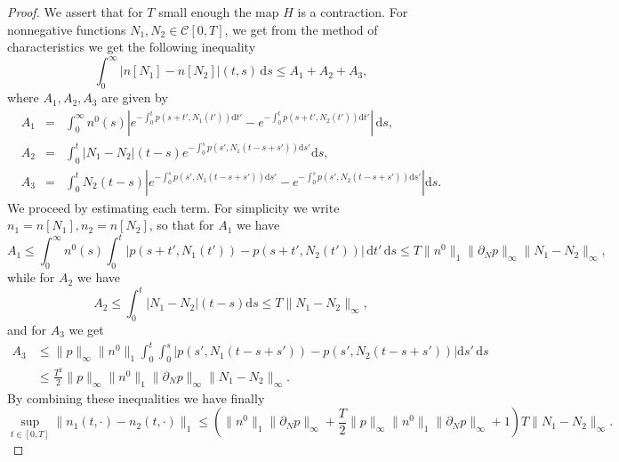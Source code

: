 \documentclass[11pt,a4paper]{article}
\newcommand{\dd}{\mathrm{d}}
\begin{document}
\begin{proof}
    We assert that for $T$ small enough the map $H$ is a contraction. For nonnegative functions $N_1,N_2\in\mathcal{C}[0,T]$, we get from the method of characteristics we get the following inequality
  \begin{equation*}
    \int_0^\infty |n[N_1]-n[N_2]|(t,s)\,\dd s\le A_1+A_2+A_3,
  \end{equation*}
    where $A_1,A_2,A_3$ are given by
    \begin{eqnarray*}
        A_1&=&\int_0^\infty n^0(s)\left|e^{-\int_0^t p(s+t',N_1(t'))\dd t'}-e^{-\int_0^t p(s+t',N_2(t'))\dd t'}\right|\,\dd s,\\
        A_2&=&\int_0^t |N_1-N_2|(t-s) e^{-\int_0^s p(s',N_1(t-s+s'))\dd s'}\dd s,\\
        A_3&=&\int_0^t N_2(t-s)\left|e^{-\int_0^s p(s',N_1(t-s+s'))\dd s'}-e^{-\int_0^s p(s',N_2(t-s+s'))\dd s'} \right|\dd s.
    \end{eqnarray*}
    We proceed by estimating each term. For simplicity we write $n_1=n[N_1],n_2=n[N_2]$, so that for $A_1$ we have
    $$A_1\le \int_0^\infty n^0(s)\int_0^t|p(s+t',N_1(t'))-p(s+t',N_2(t'))|\,\dd t'\,\dd s \le T\|n^0\|_1 \|\partial_N p\|_\infty \|N_1-N_2\|_\infty,$$
    while for $A_2$ we have
 \begin{equation*}
    A_2\le \int_0^t |N_1-N_2|(t-s) \dd s \le T\|N_1-N_2\|_\infty,
 \end{equation*}
    and for $A_3$ we get
    \begin{equation*}
    \begin{split}
        A_3 &\le \|p\|_\infty\|n^0\|_1 \int_0^t\int_0^s|p(s',N_1(t-s+s'))-p(s',N_2(t-s+s'))|\dd s'\,\dd s\\
        &\le\frac{T^2}{2} \|p\|_\infty\|n^0\|_1\|\partial_N p\|_\infty\|N_1-N_2\|_\infty. 
    \end{split}
    \end{equation*}
    By combining these inequalities we have finally
    \begin{equation}
    \label{nN1-nN2}
       \sup_{t\in [0,T]}\|n_1(t,\cdot)-n_2(t,\cdot)\|_1\le \left(\|n^0\|_1\|\partial_N p\|_\infty+\frac{T}{2}\|p\|_\infty\|n^0\|_1\|\partial_N p\|_\infty+1\right)T\|N_1-N_2\|_\infty.
    \end{equation}


\end{proof}
\end{document}

